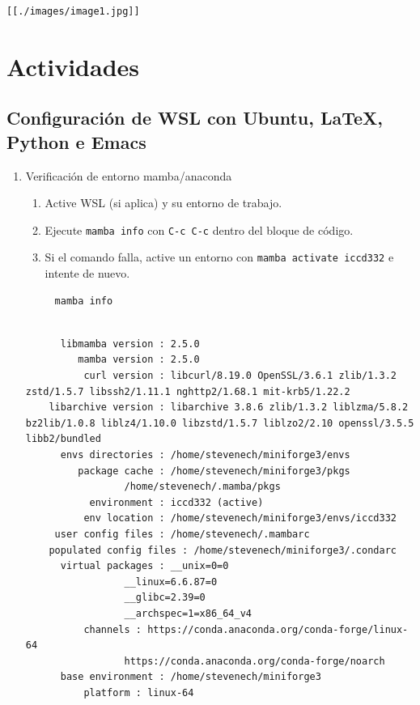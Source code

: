 \documentclass{article}
\begin{document}
\begin{verbatim}
[[./images/image1.jpg]]
\end{verbatim}
\section{Actividades}
\label{sec:orgecd4955}
\subsection{Configuración de WSL con Ubuntu, \LaTeX, Python e Emacs}
\label{sec:orgf5c7207}

\begin{enumerate}
\item Verificación de entorno mamba/anaconda
\begin{enumerate}
\item Active WSL (si aplica) y su entorno de trabajo.
\item Ejecute \texttt{mamba info} con \texttt{C-c C-c} dentro del bloque de código.
\item Si el comando falla, active un entorno con \texttt{mamba activate iccd332} e intente de nuevo.
\end{enumerate}

\begin{verbatim}
     mamba info
\end{verbatim}

\begin{verbatim}

	  libmamba version : 2.5.0
	     mamba version : 2.5.0
	      curl version : libcurl/8.19.0 OpenSSL/3.6.1 zlib/1.3.2 zstd/1.5.7 libssh2/1.11.1 nghttp2/1.68.1 mit-krb5/1.22.2
	libarchive version : libarchive 3.8.6 zlib/1.3.2 liblzma/5.8.2 bz2lib/1.0.8 liblz4/1.10.0 libzstd/1.5.7 liblzo2/2.10 openssl/3.5.5 libb2/bundled
	  envs directories : /home/stevenech/miniforge3/envs
	     package cache : /home/stevenech/miniforge3/pkgs
			     /home/stevenech/.mamba/pkgs
	       environment : iccd332 (active)
	      env location : /home/stevenech/miniforge3/envs/iccd332
	 user config files : /home/stevenech/.mambarc
    populated config files : /home/stevenech/miniforge3/.condarc
	  virtual packages : __unix=0=0
			     __linux=6.6.87=0
			     __glibc=2.39=0
			     __archspec=1=x86_64_v4
		  channels : https://conda.anaconda.org/conda-forge/linux-64
			     https://conda.anaconda.org/conda-forge/noarch
	  base environment : /home/stevenech/miniforge3
		  platform : linux-64
\end{verbatim}
\end{enumerate}
\end{document}

